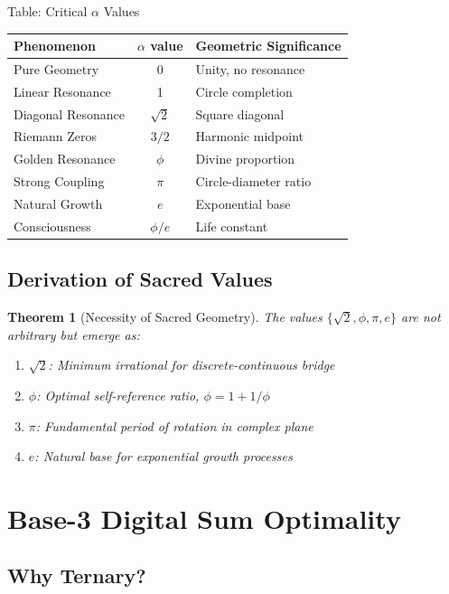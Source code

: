 \documentclass[12pt,letterpaper]{article}
\newcommand{\goldenratio}{\phi}
\newtheorem{theorem}{Theorem}[section]
\begin{document}
\begin{mathbox}{Table: Critical $\alpha$ Values}
\begin{center}
\begin{tabular}{|l|c|l|}
\hline
\textbf{Phenomenon} & \textbf{$\alpha$ value} & \textbf{Geometric Significance} \\
\hline
Pure Geometry & 0 & Unity, no resonance \\
Linear Resonance & 1 & Circle completion \\
Diagonal Resonance & $\sqrt{2}$ & Square diagonal \\
Riemann Zeros & $3/2$ & Harmonic midpoint \\
Golden Resonance & $\goldenratio$ & Divine proportion \\
Strong Coupling & $\pi$ & Circle-diameter ratio \\
Natural Growth & $e$ & Exponential base \\
Consciousness & $\goldenratio/e$ & Life constant \\
\hline
\end{tabular}
\end{center}
\end{mathbox}

\subsection{Derivation of Sacred Values}

\begin{theorem}[Necessity of Sacred Geometry]
The values $\{\sqrt{2}, \goldenratio, \pi, e\}$ are not arbitrary but emerge as:
\begin{enumerate}
\item $\sqrt{2}$: Minimum irrational for discrete-continuous bridge
\item $\goldenratio$: Optimal self-reference ratio, $\goldenratio = 1 + 1/\goldenratio$
\item $\pi$: Fundamental period of rotation in complex plane
\item $e$: Natural base for exponential growth processes
\end{enumerate}
\end{theorem}

\section{Base-3 Digital Sum Optimality}

\subsection{Why Ternary?}
\end{document}
